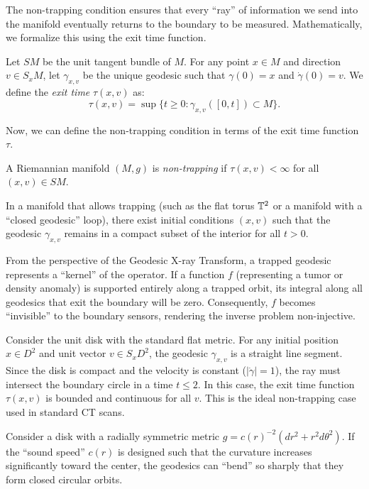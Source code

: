 The non-trapping condition ensures that every ``ray'' of information we send into the manifold eventually returns to the boundary to be measured. Mathematically, we formalize this using the exit time function.

\begin{definition}
  Let $SM$ be the unit tangent bundle of $M$. For any point $x \in M$ and direction $v \in S_x M$, let $\gamma_{x,v}$ be the unique geodesic such that $\gamma(0) = x$ and $\dot{\gamma}(0) = v$. We define the \emph{exit time} $\tau(x, v)$ as:
  \begin{equation}
    \tau(x, v) = \sup\{t \geq 0 : \gamma_{x,v}([0, t]) \subset M\}
  .\end{equation}
\end{definition}
Now, we can define the non-trapping condition in terms of the exit time function $\tau$.
\begin{definition}
  A Riemannian manifold $(M, g)$ is \emph{non-trapping} if $\tau(x, v) < \infty$ for all $(x, v) \in SM$.
\end{definition}

In a manifold that allows trapping (such as the flat torus $\mathbb{T}^2$ or a manifold with a ``closed geodesic'' loop), there exist initial conditions $(x, v)$ such that the geodesic $\gamma_{x,v}$ remains in a compact subset of the interior for all $t > 0$.

From the perspective of the Geodesic X-ray Transform, a trapped geodesic represents a ``kernel'' of the operator. If a function $f$ (representing a tumor or density anomaly) is supported entirely along a trapped orbit, its integral along all geodesics that exit the boundary will be zero. Consequently, $f$ becomes ``invisible'' to the boundary sensors, rendering the inverse problem non-injective.

\begin{example}
  Consider the unit disk with the standard flat metric. For any initial position $x \in D^2$ and unit vector $v \in S_x D^2$, the geodesic $\gamma_{x,v}$ is a straight line segment. Since the disk is compact and the velocity is constant ($|\dot{\gamma}| = 1$), the ray must intersect the boundary circle in a time $t \leq 2$. In this case, the exit time function $\tau(x,v)$ is bounded and continuous for all $v$. This is the ideal non-trapping case used in standard CT scans.
\end{example}

\begin{example}\label{exm:maxwell_fish_eye}
  Consider a disk with a radially symmetric metric $g = c(r)^{-2}(dr^2 + r^2 d\theta^2)$. If the ``sound speed'' $c(r)$ is designed such that the curvature increases significantly toward the center, the geodesics can ``bend'' so sharply that they form closed circular orbits.
\end{example}

